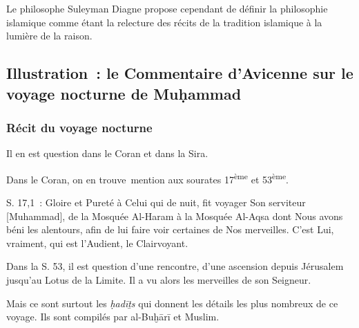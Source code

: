 Le philosophe Suleyman Diagne propose cependant de définir la
philosophie islamique comme étant la relecture des récits de la
tradition islamique à la lumière de la raison.


\subsection{Illustration~: le Commentaire d'Avicenne
sur le voyage nocturne de Muḥammad
}

\subsubsection{Récit du voyage
nocturne}

Il en est question dans le Coran et dans la Sira.

Dans le Coran, on en trouve~mention aux sourates 17\textsuperscript{ème}
et 53\textsuperscript{ème}.

S. 17,1~: Gloire et Pureté à Celui qui de nuit, fit voyager Son
serviteur {[}Muhammad{]}, de la Mosquée Al-Haram à la Mosquée Al-Aqsa
dont Nous avons béni les alentours, afin de lui faire voir certaines de
Nos merveilles. C'est Lui, vraiment, qui est l'Audient, le
Clairvoyant.

Dans la S. 53, il est question d'une rencontre, d'une ascension depuis
Jérusalem jusqu'au Lotus de la Limite. Il a vu alors les merveilles de
son Seigneur.

Mais ce sont surtout les \emph{ḥadīṯs} qui donnent les détails les plus
nombreux de ce voyage. Ils sont compilés par al-Buḫārī et
Muslim.

